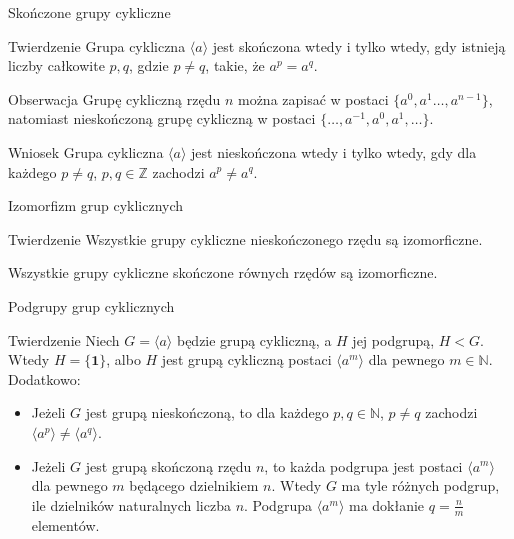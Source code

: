 \documentclass{beamer}
\newcommand{\one}{\mathbf{1}}
\begin{document}
\begin{frame}{Skończone grupy cykliczne}
    \begin{block}{Twierdzenie}
        Grupa cykliczna $\langle a \rangle$ jest skończona wtedy i tylko wtedy, gdy istnieją liczby całkowite $p,q$, gdzie 
        $p \neq q$, takie, że $a^p =a^q$.
    \end{block}
    \pause
    \begin{alertblock}{Obserwacja}
        Grupę cykliczną rzędu $n$ można zapisać w postaci $\{a^0,a^1 \ldots, a^{n-1}\}$, 
        natomiast nieskończoną grupę cykliczną w postaci $\{\ldots, a^{-1}, a^0, a^1, \ldots\}.$
    \end{alertblock}
    \begin{alertblock}{Wniosek}
        Grupa cykliczna $\langle a \rangle$ jest nieskończona wtedy i tylko wtedy, gdy dla każdego $p \neq q$, $p,q \in \mathbb{Z}$
        zachodzi $a^p \neq a^q$.
    \end{alertblock}
\end{frame}

\begin{frame}{Izomorfizm grup cyklicznych}
    \begin{block}{Twierdzenie}
        Wszystkie grupy cykliczne nieskończonego rzędu są izomorficzne.
        
        Wszystkie grupy cykliczne skończone równych rzędów są izomorficzne.
    \end{block}
\end{frame}

\begin{frame}{Podgrupy grup cyklicznych}
    \begin{block}{Twierdzenie}
        Niech $G =\langle a \rangle$ będzie grupą cykliczną, a $H$ jej podgrupą,
        $H < G$. Wtedy $H = \{\one\}$, albo $H$ jest grupą cykliczną postaci $\langle a^m \rangle$ dla pewnego $m \in \mathbb{N}$.
        Dodatkowo:
        \begin{itemize}
            \item Jeżeli $G$ jest grupą nieskończoną, to dla każdego $p,q\in \mathbb{N}$, $p \neq q$ zachodzi $\langle a^p \rangle \neq \langle a^q \rangle$.
            \item Jeżeli $G$ jest grupą skończoną rzędu $n$, to każda podgrupa jest postaci $\langle a^m \rangle$ dla pewnego $m$ będącego dzielnikiem $n$. Wtedy $G$ ma tyle różnych podgrup, ile dzielników naturalnych liczba $n$. Podgrupa $\langle a^m \rangle$ ma dokłanie $q = \frac{n}{m}$ elementów.
        \end{itemize}
    \end{block}
\end{frame}
\end{document}
